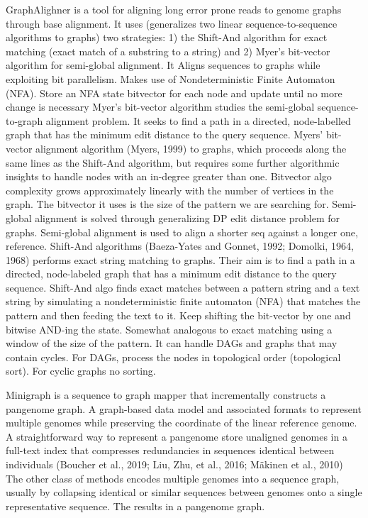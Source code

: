 \documentclass[11pt]{article}
\begin{document}
GraphAlighner \cite{rautiainenBitparallelSequencetographAlignment2019} is a tool 
for aligning long error prone reads to genome graphs through base alignment.
It uses (generalizes two linear sequence-to-sequence algorithms to graphs) two 
strategies: 1) the Shift-And algorithm for exact matching (exact match of a
substring to a string) and 2) Myer’s bit-vector algorithm for semi-global
alignment. It Aligns sequences to graphs while exploiting bit parallelism.
Makes use of Nondeterministic Finite Automaton (NFA).
Store an NFA state bitvector for each node and update until no more change is
necessary Myer’s bit-vector algorithm studies the semi-global sequence-to-graph
alignment problem.
It seeks to find a path in a directed, node-labelled graph that has the
minimum edit distance to the query sequence. Myers’ bit-vector alignment 
algorithm (Myers, 1999) to graphs, which proceeds along the same lines as the
Shift-And algorithm, but requires some further algorithmic insights to handle 
nodes with an in-degree greater than one. Bitvector algo complexity grows 
approximately linearly with the number of vertices in the graph. The bitvector 
it uses is the size of the pattern we are searching for. Semi-global alignment 
is solved through generalizing DP edit distance problem for graphs. Semi-global 
alignment is used to align a shorter seq against a longer one, reference.
Shift-And algorithms (Baeza-Yates and Gonnet, 1992; Domolki, 1964, 1968) 
performs exact string matching to graphs. 
Their aim is to find a path in a directed, node-labeled graph that has a minimum
edit distance \cite{levenshteinBinaryCodesCapable1966a} to the query sequence. 
Shift-And algo finds exact matches between a pattern string and a text string by
simulating a nondeterministic finite automaton (NFA) that matches the pattern 
and then feeding the text to it.
Keep shifting the bit-vector by one and bitwise AND-ing the state. 
Somewhat analogous to exact matching using a window of the size of the pattern.
It can handle DAGs and  graphs that may contain cycles. For DAGs, process the 
nodes in topological order (topological sort). For cyclic graphs no sorting.

Minigraph \cite{liDesignConstructionReference2020} is a sequence to graph mapper
that incrementally constructs a pangenome graph.
A graph-based data model and associated formats to represent multiple genomes 
while preserving the coordinate of the linear reference genome. 
A straightforward way to represent a pangenome store unaligned genomes in a
full-text index that compresses redundancies in sequences identical between 
individuals (Boucher et al., 2019; Liu, Zhu, et al., 2016; Mäkinen et al., 2010) 		
The other class of methods encodes multiple genomes into a sequence graph, 
usually by collapsing identical or similar sequences between genomes onto a 
single representative sequence. The results in a pangenome graph.
\end{document}

